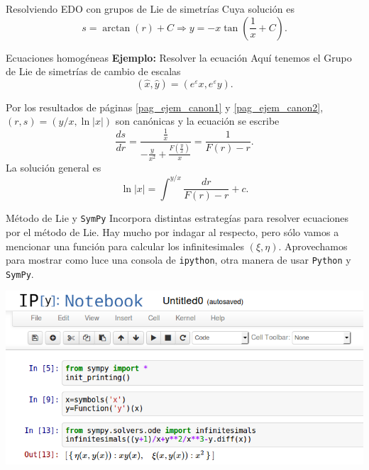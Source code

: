 \documentclass[handout,hyperref={colorlinks=true}]{beamer}
\renewcommand{\epsilon}{\varepsilon}
\begin{document}
\begin{frame}{Resolviendo EDO con grupos de Lie de simetrías}
Cuya solución es 
\[s=\arctan(r)+C\Rightarrow y=-x\tan\left(\frac{1}{x}+C\right).\]
\end{frame}


\begin{frame}{Ecuaciones homogéneas}
\textbf{Ejemplo:} Resolver la ecuación 
Aquí tenemos el Grupo de Lie de simetrías de cambio de escalas
\[(\hat{x},\hat{y})=(e^{\epsilon}x,e^{\epsilon}y).\] 

Por los resultados de páginas \ref{pag_ejem_canon1} y \ref{pag_ejem_canon2}, $(r,s)=(y/x,\ln|x|)$ son canónicas y la ecuación se escribe
\[\frac{ds}{dr}=\frac{\frac{1}{x}}{-\frac{y}{x^2}+\frac{F\left(\frac{y}{x}\right)}{x}}=\frac{1}{F(r)-r}.\]
La solución general es 
\[\ln|x|=\int^{y/x}\frac{dr}{F(r)-r}+c.\]

\end{frame}


\begin{frame}{Método de Lie y \texttt{SymPy}}
 Incorpora distintas estrategías para resolver ecuaciones por el método de Lie. Hay mucho por indagar al respecto, pero sólo vamos a mencionar una función para calcular los infinitesimales $(\xi,\eta)$.  Aprovechamos para mostrar como luce una consola de \texttt{ipython}, otra manera de usar \texttt{Python} y \texttt{SymPy}.

\includegraphics[scale=.45]{imagenes/ipython.png}



\end{frame}
\end{document}
